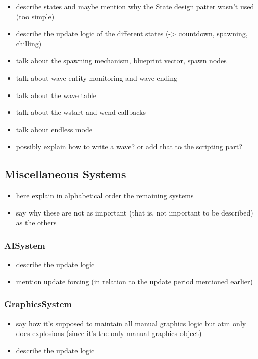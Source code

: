 \begin{itemize}
    \item describe states and maybe mention why the State design patter wasn't used (too simple)
    \item describe the update logic of the different states (-> countdown, spawning, chilling)
    \item talk about the spawning mechanism, blueprint vector, spawn nodes
    \item talk about wave entity monitoring and wave ending
    \item talk about the wave table
    \item talk about the wstart and wend callbacks
    \item talk about endless mode
    \item possibly explain how to write a wave? or add that to the scripting part?
\end{itemize}

\subsection{Miscellaneous Systems}

\begin{itemize}
    \item here explain in alphabetical order the remaining systems
    \item say why these are not as important (that is, not important to be described) as the others
\end{itemize}

\subsubsection{AISystem}

\begin{itemize}
    \item describe the update logic
    \item mention update forcing (in relation to the update period mentioned earlier)
\end{itemize}

\subsubsection{GraphicsSystem}

\begin{itemize}
    \item say how it's supposed to maintain all manual graphics logic but atm only does explosions
        (since it's the only manual graphics object)
    \item describe the update logic
\end{itemize}

